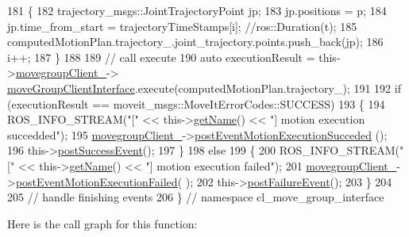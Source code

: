 \begin{DoxyCode}
181         \{
182             trajectory\_msgs::JointTrajectoryPoint jp;
183             jp.positions = p;
184             jp.time\_from\_start = trajectoryTimeStamps[i]; \textcolor{comment}{//ros::Duration(t);}
185             computedMotionPlan.trajectory\_.joint\_trajectory.points.push\_back(jp);
186             i++;
187         \}
188 
189         \textcolor{comment}{// call execute}
190         \textcolor{keyword}{auto} executionResult = this->\hyperlink{classcl__move__group__interface_1_1CbMoveEndEffectorTrajectory_aea650d3e7836125b32be97392b71a7f3}{movegroupClient\_}->
      \hyperlink{classcl__move__group__interface_1_1ClMoveGroup_a92922ea689e4e1b7b91512c56629c95b}{moveGroupClientInterface}.execute(computedMotionPlan.trajectory\_);
191 
192         \textcolor{keywordflow}{if} (executionResult == moveit\_msgs::MoveItErrorCodes::SUCCESS)
193         \{
194             ROS\_INFO\_STREAM(\textcolor{stringliteral}{"["} << this->\hyperlink{classsmacc_1_1ISmaccClientBehavior_a18e4bec9460b010f2894c0f7e7064a34}{getName}() << \textcolor{stringliteral}{"] motion execution succedded"});
195             \hyperlink{classcl__move__group__interface_1_1CbMoveEndEffectorTrajectory_aea650d3e7836125b32be97392b71a7f3}{movegroupClient\_}->\hyperlink{classcl__move__group__interface_1_1ClMoveGroup_aebaf269db373d41837bae87651458e54}{postEventMotionExecutionSucceded}
      ();
196             this->\hyperlink{classsmacc_1_1SmaccAsyncClientBehavior_adf18efe1f0e4eacc1277b8865a8a94b1}{postSuccessEvent}();
197         \}
198         \textcolor{keywordflow}{else}
199         \{
200             ROS\_INFO\_STREAM(\textcolor{stringliteral}{"["} << this->\hyperlink{classsmacc_1_1ISmaccClientBehavior_a18e4bec9460b010f2894c0f7e7064a34}{getName}() << \textcolor{stringliteral}{"] motion execution failed"});
201             \hyperlink{classcl__move__group__interface_1_1CbMoveEndEffectorTrajectory_aea650d3e7836125b32be97392b71a7f3}{movegroupClient\_}->\hyperlink{classcl__move__group__interface_1_1ClMoveGroup_a39dc3871d29b2af1ab739057f6ca6daa}{postEventMotionExecutionFailed}(
      );
202             this->\hyperlink{classsmacc_1_1SmaccAsyncClientBehavior_af6fa358cb1ab5ed16791a201f59260e0}{postFailureEvent}();
203         \}
204 
205         \textcolor{comment}{// handle finishing events}
206     \} \textcolor{comment}{// namespace cl\_move\_group\_interface}
\end{DoxyCode}
Here is the call graph for this function\+:
\nopagebreak
